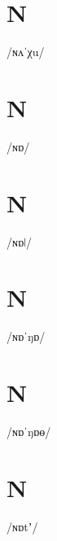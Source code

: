 \documentclass[10pt,a4paper,twoside]{book}
\begin{document}
\section*{N}

\begin{multicols}{3}
 {/ɴʌˈχu/} {}
\end{multicols}

\section*{N}

\begin{multicols}{3}
 {/ɴɒ/} {}
\end{multicols}

\section*{N}

\begin{multicols}{3}
 {/ɴɒǀ/} {}
\end{multicols}

\section*{N}

\begin{multicols}{3}
 {/ɴɒˈŋɒ/} {}
\end{multicols}

\section*{N}

\begin{multicols}{3}
 {/ɴɒˈŋɒɵ/} {}
\end{multicols}

\section*{N}

\begin{multicols}{3}
 {/ɴɒtʼ/} {}
\end{multicols}
\end{document}
